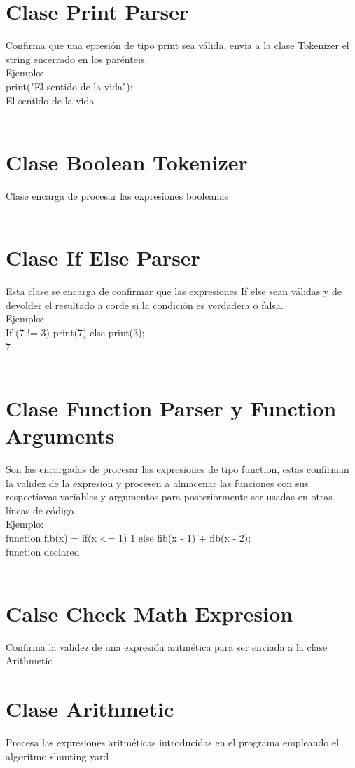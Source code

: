 \documentclass{article}
\begin{document}
\section{Clase Print Parser}
Confirma que una epresión de tipo print sea válida, envia a la clase Tokenizer el string encerrado en los parénteis. \\ Ejemplo: \\ print("El sentido de la vida"); \\ El sentido de la vida \\ \\

\section{Clase Boolean Tokenizer}
Clase encarga de procesar las expresiones booleanas\\ \\

\section{Clase If Else Parser}
Esta clase se encarga de confirmar que las expresiones If else sean válidas y de devolder el resultado a corde si la condición es verdadera o falsa.\\ Ejemplo:\\
If (7 != 3) print(7) else print(3); \\ 7\\ \\

\section{Clase Function Parser y Function Arguments}
Son las encargadas de procesar las expresiones de tipo function, estas confirman la validez de la expresion y procesen a almacenar las funciones con sus respectiavas variables y argumentos para posteriormente ser usadas en otras líneas de código.\\ Ejemplo: \\ function fib(x) = if(x <= 1) 1 else fib(x - 1) + fib(x - 2); \\ function declared \\ \\

\section{Calse Check Math Expresion}
Confirma la validez de una expresión aritmética para ser enviada a la clase Arithmetic

\section{Clase Arithmetic}
Procesa las expresiones aritméticas introducidas en el programa empleando el algoritmo shunting yard
\end{document}
